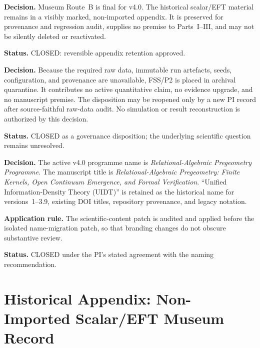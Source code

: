 \documentclass[12pt,a4paper,twoside]{article}
\theoremstyle{plain}
\theoremstyle{definition}
\theoremstyle{remark}
\begin{document}
\begin{pioverridebox}
\label{box:pi-decision-d23-museum}
\textbf{Decision.} Museum Route~B is final for v4.0. The historical scalar/EFT
material remains in a visibly marked, non-imported appendix. It is preserved
for provenance and regression audit, supplies no premise to Parts~I--III, and
may not be silently deleted or reactivated.

\textbf{Status.} CLOSED: reversible appendix retention approved.
\end{pioverridebox}

\begin{pioverridebox}
\label{box:pi-decision-d24-p2}
\textbf{Decision.} Because the required raw data, immutable run artefacts,
seeds, configuration, and provenance are unavailable, FSS/P2 is placed in
archival quarantine. It contributes no active quantitative claim, no evidence
upgrade, and no manuscript premise. The disposition may be reopened only by a
new PI record after source-faithful raw-data audit. No simulation or result
reconstruction is authorized by this decision.

\textbf{Status.} CLOSED as a governance disposition; the underlying
scientific question remains unresolved.
\end{pioverridebox}

\begin{pioverridebox}
\label{box:pi-decision-d25-name}
\textbf{Decision.} The active v4.0 programme name is
\emph{Relational-Algebraic Pregeometry Programme}. The manuscript title is
\emph{Relational-Algebraic Pregeometry: Finite Kernels, Open Continuum
Emergence, and Formal Verification}. ``Unified Information-Density Theory
(UIDT)'' is retained as the historical name for versions~1--3.9, existing DOI
titles, repository provenance, and legacy notation.

\textbf{Application rule.} The scientific-content patch is audited and
applied before the isolated name-migration patch, so that branding changes do
not obscure substantive review.

\textbf{Status.} CLOSED under the PI's stated agreement with the naming
recommendation.
\end{pioverridebox}

\toggletrue{museumwatermark}
\part*{Historical Appendix: Non-Imported Scalar/EFT Museum Record}
\end{document}
